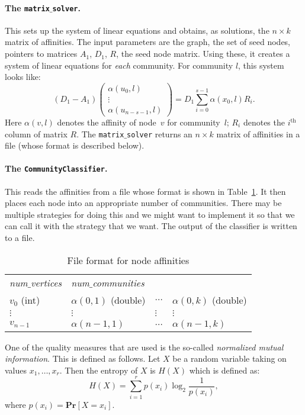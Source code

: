 \documentclass[12pt]{article}
\renewcommand{\th}{\ensuremath{^{\mathrm{th}}}}
\renewcommand{\Pr}[1]{\ensuremath{\mathbf{Pr} \left [ #1 \right]}}
\begin{document}
\paragraph{The \texttt{matrix$\_$solver}.} This sets up the system of 
linear equations and obtains, as solutions, the $n \times k$ matrix 
of affinities. The input parameters are the graph, the set of seed nodes, 
pointers to matrices $A_1$, $D_1$, $R$, the seed node matrix. Using these, 
it creates a system of linear equations for \emph{each} community.   
For community $l$, this system looks like:
\[
	(D_1 -  A_1) \begin{pmatrix} \alpha(u_0, l) \\ \vdots \\ \alpha(u_{n - s -1}, l) \end{pmatrix}	
		= D_1 \sum_{i = 0}^{s - 1} \alpha(x_0, l) R_i. 
\] 
Here $\alpha(v, l)$ denotes the affinity of node~$v$ for community~$l$; $R_i$ 
denotes the $i\th$ column of matrix $R$. The \texttt{matrix$\_$solver} returns 
an $n \times k$ matrix of affinities in a file (whose format is described below).

\paragraph{The \texttt{CommunityClassifier}.} This reads the affinities 
from a file whose format is shown in Table~\ref{tab:node_aff}.
It then places each node into an appropriate number of communities. There 
may be multiple strategies for doing this and we might want to implement it 
so that we can call it with the strategy that we want. The output of the 
classifier is written to a file.

\begin{table}[ht]
\centering
\begin{tabular}{llll}
\emph{num$\_$vertices} & \emph{num$\_$communities} &  & \\
$v_0$ (int)              & $\alpha(0, 1)$ (double) & $\ldots$ & $\alpha(0, k)$ (double) \\
$\vdots$ & $\vdots$ & $\vdots$ & $\vdots$ \\
$v_{n-1}$  & $\alpha(n-1, 1)$ & $\ldots$ & $\alpha(n-1, k)$ 
\end{tabular}
\caption{File format for node affinities}\label{tab:node_aff}
\end{table}
%

One of the quality measures that are used is the so-called \emph{normalized
mutual information}. This is defined as follows. Let $X$ be a random variable 
taking on values $x_1, \ldots, x_r$. Then the entropy of $X$ is $H(X)$ 
which is defined as:
\[
	H(X) = \sum_{i = 1}^r p(x_i) \log_2 \frac{1}{p(x_i)}, 
\]
where $p(x_i) = \Pr{X = x_i}$.
\end{document}
